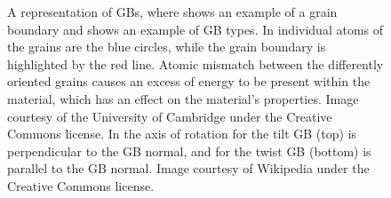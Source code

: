 \documentclass[12pt]{report}
\begin{document}
\begin{figure}[ht!]
 \centering
 
 \quad
 \quad
 \caption{\label{gbs} A representation of GBs, where \protect{} shows an example of a grain boundary and \protect{} shows an example of GB types.  In \protect{} individual atoms of the grains are the blue circles, while the grain boundary is highlighted by the red line.  Atomic mismatch between the differently oriented grains causes an excess of energy to be present within the material, which has an effect on the material's properties.  Image courtesy of the University of Cambridge under the Creative Commons license. In \protect{} the axis of rotation for the tilt GB (top) is perpendicular to the GB normal, and for the twist GB (bottom) is parallel to the GB normal.  Image courtesy of Wikipedia under the Creative Commons license.}
\end{figure}
\end{document}
